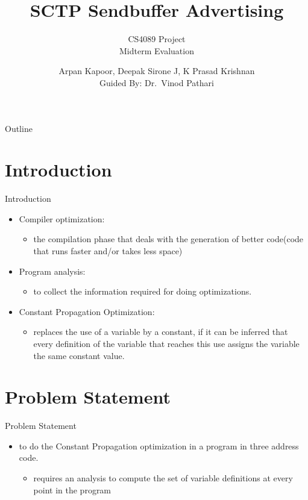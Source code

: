\documentclass{beamer}
\title{SCTP Sendbuffer Advertising}
\subtitle{CS4089 Project\\
	Midterm Evaluation}
\author{Arpan Kapoor, Deepak Sirone J, K Prasad Krishnan\\
	Guided By: Dr.~Vinod Pathari}
\begin{document}
\begin{frame}
	\titlepage
\end{frame}

\begin{frame}{Outline}
	\tableofcontents
\end{frame}

\section{Introduction}
\begin{frame}{Introduction}
\begin{itemize}
	\item Compiler optimization:
	\begin{itemize}
		\item the compilation phase that deals with the generation of
			better code(code that runs faster and/or takes less
			space)
	\end{itemize}
\end{itemize}

\begin{itemize}
	\item Program analysis:
	\begin{itemize}
		\item to collect the information required for doing
			optimizations.
	\end{itemize}
\end{itemize}

\begin{itemize}
	\item Constant Propagation Optimization: 
	\begin{itemize}
		\item replaces the use of a variable by a constant, if it can
			be inferred that every definition of the variable that
			reaches this use assigns the variable the same constant
			value.
	\end{itemize}
\end{itemize}
\end{frame}

\section{Problem Statement}
\begin{frame}{Problem Statement}
\begin{itemize}
	\item to do the Constant Propagation optimization in a program in three
		address code.
	\begin{itemize}
		\item requires an analysis to compute the set of variable
			definitions at every point in the program
	\end{itemize}
\end{itemize}
\end{frame}
\end{document}
